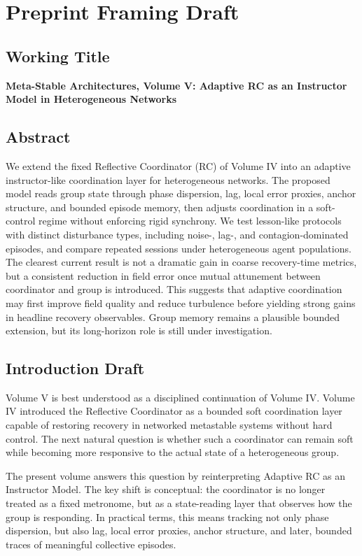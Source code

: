 \section*{Preprint Framing Draft}

\subsection*{Working Title}
\textbf{Meta-Stable Architectures, Volume V: Adaptive RC as an Instructor Model in Heterogeneous Networks}

\subsection*{Abstract}
We extend the fixed Reflective Coordinator (RC) of Volume IV into an adaptive instructor-like coordination layer for heterogeneous networks. The proposed model reads group state through phase dispersion, lag, local error proxies, anchor structure, and bounded episode memory, then adjusts coordination in a soft-control regime without enforcing rigid synchrony. We test lesson-like protocols with distinct disturbance types, including noise-, lag-, and contagion-dominated episodes, and compare repeated sessions under heterogeneous agent populations. The clearest current result is not a dramatic gain in coarse recovery-time metrics, but a consistent reduction in field error once mutual attunement between coordinator and group is introduced. This suggests that adaptive coordination may first improve field quality and reduce turbulence before yielding strong gains in headline recovery observables. Group memory remains a plausible bounded extension, but its long-horizon role is still under investigation.

\subsection*{Introduction Draft}
Volume V is best understood as a disciplined continuation of Volume IV. Volume IV introduced the Reflective Coordinator as a bounded soft coordination layer capable of restoring recovery in networked metastable systems without hard control. The next natural question is whether such a coordinator can remain soft while becoming more responsive to the actual state of a heterogeneous group.

The present volume answers this question by reinterpreting Adaptive RC as an Instructor Model. The key shift is conceptual: the coordinator is no longer treated as a fixed metronome, but as a state-reading layer that observes how the group is responding. In practical terms, this means tracking not only phase dispersion, but also lag, local error proxies, anchor structure, and later, bounded traces of meaningful collective episodes.

